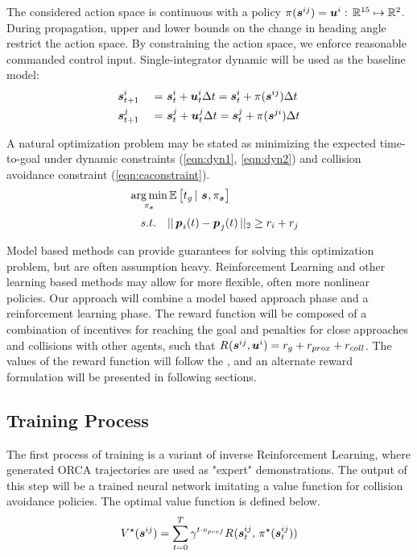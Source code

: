\documentclass[conference]{IEEEtran}
\begin{document}
The considered action space is continuous with a policy $\pi_{}(\boldsymbol{s}^{ij}_{})=\boldsymbol{u}^{i}_{\,} : \, \mathbb{R}^{15}\mapsto\mathbb{R}^2$.  During propagation, upper and lower bounds on the change in heading angle restrict the action space. By constraining the action space, we enforce reasonable commanded control input. Single-integrator dynamic will be used as the baseline model: 
\begin{alignat}{3}
& \state{i}{t+1} & \ = \ & \state{i}{t} + \ctrl{i}{t}\dt = \state{i}{t} + \policy{}(\state{ij}{})\dt \label{eqn:dyn1} \\
& \state{j}{t+1} & \ = \ &\state{j}{t} + \ctrl{j}{t}\dt = \state{j}{t} + \policy{}(\state{ji}{})\dt \label{eqn:dyn2} 
\end{alignat}

A natural optimization problem may be stated as minimizing the expected time-to-goal under dynamic constraints (\ref{eqn:dyn1}, \ref{eqn:dyn2}) and collision avoidance constraint (\ref{eqn:caconstraint}).
\begin{alignat}{3}
    && \argmin\limits_{\policy{\state{}{}}} & \expectation \left[t_g \, | \ \state{}{}, \policy{\state{}{}}  \right] \\
    && s.t. \quad & \norm{\posvec{i}(t) - \posvec{j}(t)}_2 \geq \radius{i} + \radius{j} \label{eqn:caconstraint}
\end{alignat}

Model based methods can provide guarantees for solving this optimization problem, but are often assumption heavy. Reinforcement Learning  and other learning based methods may allow for more flexible, often more nonlinear policies. 
Our approach will combine a model based approach phase and a reinforcement learning phase.
The reward function will be composed of a combination of incentives for reaching the goal and penalties for close approaches and collisions with other agents, such that $R_{}(\boldsymbol{s}^{ij}_{},\boldsymbol{u}^{i}_{})=r_{g}+r_{prox}+r_{coll}$. The values of the reward function will follow the \cite{chen2017cadrl}, and an alternate reward formulation will be presented in following sections.
\subsection{Training Process}
The first process of training is a variant of inverse Reinforcement Learning, where generated ORCA trajectories are used as "expert" demonstrations. The output of this step will be a trained neural network imitating a value function for collision avoidance policies. The optimal value function is defined below.
\begin{equation}
V^{\star}(\boldsymbol{s}^{ij}_{})=\sum_{t=0}^T \gamma^{t\cdot v_{pref}}R_{}(\boldsymbol{s}^{ij}_{t}, \, \pi_{}^{\star}(\boldsymbol{s}^{ij}_{t}))
\end{equation}
\end{document}
